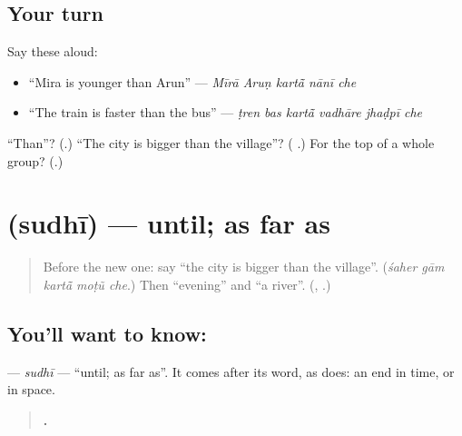 \subsection*{Your turn}
Say these aloud:

\begin{itemize}
\raggedright
  \item \textquotedblleft{}Mira is younger than Arun\textquotedblright{} — \emph{Mīrā Aruṇ kartā̃ nānī che}
  \item \textquotedblleft{}The train is faster than the bus\textquotedblright{} — \emph{ṭren bas kartā̃ vadhāre jhaḍpī che}
\end{itemize}

\begin{tcolorbox}[breakable,colback=teal!4,colframe=teal!35!black,title={Before you move on}]
\textquotedblleft{}Than\textquotedblright{}? (\textbf{}.) \textquotedblleft{}The city is bigger than the village\textquotedblright{}? (\textbf{    }.) For the top of a whole group? (\textbf{}.)
\end{tcolorbox}
\section[\texorpdfstring{\gu{સુધી} (sudhī)}{સુધી (sudhī)}]{ (sudhī) — until; as far as}

\label{lesson:GU-C282-sudhi}



\begin{quote}
Before the new one: say \textquotedblleft{}the city is bigger than the village\textquotedblright{}. (\emph{śaher gām kartā̃ moṭũ che}.) Then \textquotedblleft{}evening\textquotedblright{} and \textquotedblleft{}a river\textquotedblright{}. (\textbf{}, \textbf{}.)
\end{quote}

\subsection*{You'll want to know: }
\textbf{} — \emph{sudhī} — \textquotedblleft{}until; as far as\textquotedblright{}. It comes after its word, as \textbf{} does: an end in time, or in space.

\begin{quote}
\textbf{    .}
\end{quote}

